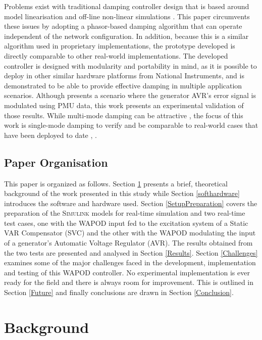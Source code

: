 \documentclass{ieeeaccess}
\begin{document}
Problems exist with traditional damping controller design that is based around model linearisation and off-line non-linear simulations \cite{WAPODChina}. This paper circumvents these issues by adopting a phasor-based damping algorithm \cite{PhasorPOD} that can operate independent of the network configuration. In addition, because this is a similar algorithm used in proprietary implementations\cite{WAPODNorway}, the prototype developed is directly comparable to other real-world implementations. The developed controller is designed with modularity and portability in mind, as it is possible to deploy in other similar hardware platforms from National Instruments, and is demonstrated to be able to provide effective damping in multiple application scenarios. Although \cite{Yuwa} presents a scenario where the generator AVR\rq{s} error signal is modulated using PMU data, this work presents an experimental validation of those results. While multi-mode damping can be attractive \cite{Kamwa}, the focus of this work is  single-mode damping to verify and be comparable to real-world cases that have been deployed to date \cite{WAPODNorway}, \cite{WAPODChina} .

\subsection{Paper Organisation}

This paper is organized as follows. Section \ref{Background} presents a brief, theoretical background of the work presented in this study while Section \ref{softhardware} introduces the software and hardware used. Section \ref{SetupPreparation} covers the preparation of the \textsc{Simulink} models for real-time simulation and two real-time test cases, one with the WAPOD input fed to the excitation system of a Static VAR Compensator (SVC) and the other with the WAPOD modulating the input of a generator\rq{s} Automatic Voltage Regulator (AVR). The results obtained from the two tests are presented and analysed in Section \ref{Results}. Section \ref{Challenges} examines some of the major challenges faced in the development, implementation and testing of this WAPOD controller. No experimental implementation is ever ready for the field and there is always room for improvement. This is outlined in Section \ref{Future} and finally conclusions are drawn in Section \ref{Conclusion}.

\section{Background}\label{Background}
\end{document}

